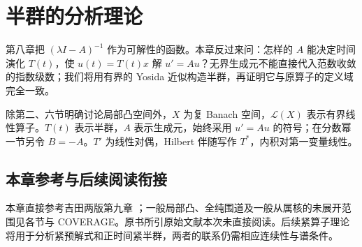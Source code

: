 \chapter{半群的分析理论}\label{ch:yosida-09}

第八章把 $(\lambda I-A)^{-1}$ 作为可解性的函数。本章反过来问：怎样的 $A$ 能决定时间演化 $T(t)$，使 $u(t)=T(t)x$ 解 $u'=Au$？无界生成元不能直接代入范数收敛的指数级数；我们将用有界的 Yosida 近似构造半群，再证明它与原算子的定义域完全一致。

除第二、六节明确讨论局部凸空间外，$X$ 为复 Banach 空间，$\mathcal L(X)$ 表示有界线性算子。$T(t)$ 表示半群，$A$ 表示生成元，始终采用 $u'=Au$ 的符号；在分数幂一节另令 $B=-A$。$T'$ 为线性对偶，Hilbert 伴随写作 $T^*$，内积对第一变量线性。















\section*{本章参考与后续阅读衔接}
本章直接参考吉田两版第九章 \cite{yosida-zh,yosida-en}；一般局部凸、全纯围道及一般从属核的未展开范围见各节与 COVERAGE。原书所引原始文献本次未直接阅读。后续紧算子理论将用于分析紧预解式和正时间紧半群，两者的联系仍需相应连续性与谱条件。
